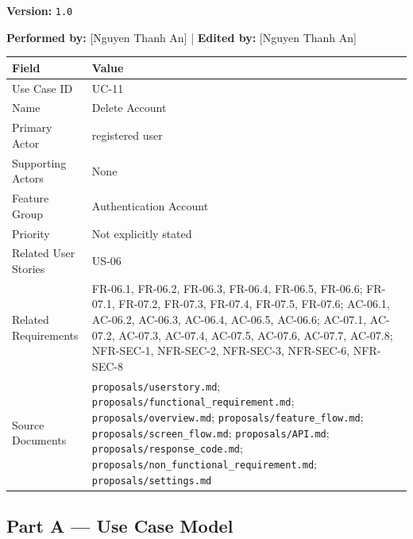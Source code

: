 \documentclass[12pt]{article}
\renewcommand{\baselinestretch}{1.5}
\begin{document}
\textbf{Version:} \texttt{1.0}
\par\medskip

\textbf{Performed by:} [Nguyen Thanh An] | \textbf{Edited by:} [Nguyen Thanh An]
\par\medskip

\begingroup
\small
\renewcommand{\baselinestretch}{1.0}\selectfont
\renewcommand{\arraystretch}{1.15}
\setlength{\tabcolsep}{6pt}
\begin{longtable}{|>{\raggedright\arraybackslash}p{}|>{\raggedright\arraybackslash}p{}|}
\hline
\textbf{Field} & \textbf{Value} \\ \hline
\endhead
Use Case ID & UC-11 \\ \hline
Name & Delete Account \\ \hline
Primary Actor & registered user \\ \hline
Supporting Actors & None \\ \hline
Feature Group & Authentication Account \\ \hline
Priority & Not explicitly stated \\ \hline
Related User Stories & US-06 \\ \hline
Related Requirements & FR-06.1, FR-06.2, FR-06.3, FR-06.4, FR-06.5, FR-06.6; FR-07.1, FR-07.2, FR-07.3, FR-07.4, FR-07.5, FR-07.6; AC-06.1, AC-06.2, AC-06.3, AC-06.4, AC-06.5, AC-06.6; AC-07.1, AC-07.2, AC-07.3, AC-07.4, AC-07.5, AC-07.6, AC-07.7, AC-07.8; NFR-SEC-1, NFR-SEC-2, NFR-SEC-3, NFR-SEC-6, NFR-SEC-8 \\ \hline
Source Documents & \texttt{proposals/userstory.md}; \texttt{proposals/functional\_requirement.md}; \texttt{proposals/overview.md}; \texttt{proposals/feature\_flow.md}; \texttt{proposals/screen\_flow.md}; \texttt{proposals/API.md}; \texttt{proposals/response\_code.md}; \texttt{proposals/non\_functional\_requirement.md}; \texttt{proposals/settings.md} \\ \hline
\end{longtable}
\endgroup
\par\medskip

\hypertarget{sec:part-a-use-case-model}{}
\subsection*{Part A --- Use Case Model}
\par\medskip

\hypertarget{sec:a1-focused-use-case-diagram}{}
\end{document}
